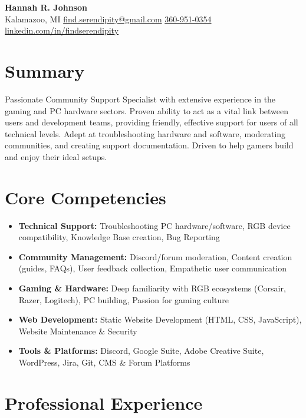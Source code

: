 \documentclass[a4paper,12pt]{article} %
\begin{document}
\begin{center}
    {\LARGE \textbf{Hannah R. Johnson}} \\
    \vspace{1mm}
    Kalamazoo, MI \textbar{} \href{mailto:find.serendipity@gmail.com}{find.serendipity@gmail.com} \textbar{} \href{tel:360-951-0354}{360-951-0354} \textbar{} \href{https://www.linkedin.com/in/findserendipity/}{linkedin.com/in/findserendipity}
\end{center}

\section{Summary}
Passionate Community Support Specialist with extensive experience in the gaming and PC hardware sectors. Proven ability to act as a vital link between users and development teams, providing friendly, effective support for users of all technical levels. Adept at troubleshooting hardware and software, moderating communities, and creating support documentation. Driven to help gamers build and enjoy their ideal setups.

\section{Core Competencies}
\begin{itemize}
    \item \textbf{Technical Support:} Troubleshooting PC hardware/software, RGB device compatibility, Knowledge Base creation, Bug Reporting
    \item \textbf{Community Management:} Discord/forum moderation, Content creation (guides, FAQs), User feedback collection, Empathetic user communication
    \item \textbf{Gaming \& Hardware:} Deep familiarity with RGB ecosystems (Corsair, Razer, Logitech), PC building, Passion for gaming culture
    \item \textbf{Web Development:} Static Website Development (HTML, CSS, JavaScript), Website Maintenance \& Security
    \item \textbf{Tools \& Platforms:} Discord, Google Suite, Adobe Creative Suite, WordPress, Jira, Git, CMS \& Forum Platforms
\end{itemize}

\section{Professional Experience}
\end{document}
